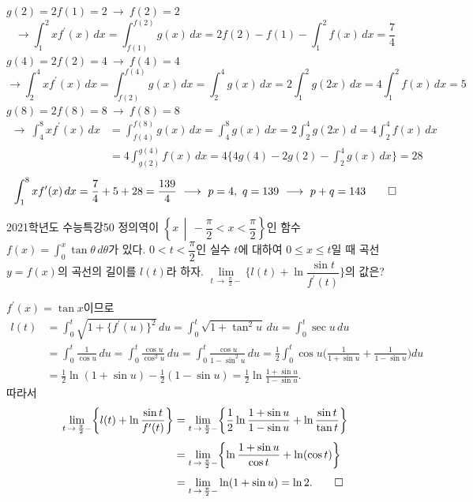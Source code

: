 \documentclass{article}
\begin{document}
\begin{sol}
	$g(2)=2f(1)=2~\longrightarrow~f(2)=2$
	\[
		\longrightarrow\int_1^2xf^{\prime}(x)\,dx=\int_{f(1)}^{f(2)}g(x)\,dx=2f(2)-f(1)-\int_1^2f(x)\,dx=\frac{7}{4}
	\]
	$g(4)=2f(2)=4~\longrightarrow~f(4)=4$
	\[
		\longrightarrow\int_2^4xf^{\prime}(x)\,dx=\int_{f(2)}^{f(4)}g(x)\,dx=\int_2^4g(x)\,dx=2\int_1^2g(2x)\,dx=4\int_1^2f(x)\,dx=5
	\]
	$g(8)=2f(8)=8~\longrightarrow~f(8)=8$
	\[
		\begin{aligned}
			\longrightarrow~\int_4^8xf^{\prime}(x)\,dx&=\int_{f(4)}^{f(8)}g(x)\,dx=\int_4^8g(x)\,dx=2\int_2^4g(2x)\,d=4\int_2^4f(x)\,dx\\[3pt]
			&=4\int_{g(2)}^{g(4)} f(x)\,dx=4\biggl\{4g(4)-2g(2)-\int_2^4g(x)\,dx\biggr\}=28
		\end{aligned}
	\]
	\[
		\int_1^8xf^{\prime}(x)\,dx=\frac{7}{4}+5+28=\frac{139}{4}~\longrightarrow~p=4,~q=139~\longrightarrow~p+q=143\qed
	\]
\end{sol}

\newpage
\begin{prob}{2021학년도 수능특강}{50}
	정의역이 $\left\{x\,\middle\vert\,-\dfrac{\pi}{2}<x<\dfrac{\pi}{2}\right\}$인 함수 $f(x)=\displaystyle\int_0^x\tan\theta\,d\theta$가 있다. $0<t<\dfrac{\pi}{2}$인 실수 $t$에 대하여 $0\leq x\leq t$일 때 곡선 $y=f(x)$의 곡선의 길이를 $l(t)$라 하자. $\lim\limits_{t\,\to\,\frac{\pi}{2}-}\biggl\{l(t)+\ln\dfrac{\sin t}{f^{\prime}(t)}\biggr\}$의 값은?
\end{prob}

\begin{sol}
	$f^\prime(x)=\tan x$이므로
	\[
		\begin{aligned}
			l(t)&=\int_0^t\sqrt{1+\{f^{\prime}(u)\}^2}\,du=\int_0^t\sqrt{1+\tan^2u}\,du=\int_0^t\sec u\,du\\[3pt]
			&=\int_0^t\frac{1}{\cos u}\,du=\int_0^t\frac{\cos u}{\cos^2u}\,du=\int_0^t\frac{\cos u}{1-\sin^2u}\,du=\frac{1}{2}\int_0^t\cos u\biggl(\frac{1}{1+\sin u}+\frac{1}{1-\sin u}\biggr)du\\[3pt]
			&=\frac{1}{2}\ln(1+\sin u)-\frac{1}{2}(1-\sin u)=\frac{1}{2}\ln\frac{1+\sin u}{1-\sin u}.
		\end{aligned}
	\]
	따라서
	\[
		\begin{aligned}
			\lim\limits_{t\,\to\,\frac{\pi}{2}-}\biggl\{l(t)+\ln\frac{\sin t}{f^{\prime}(t)}\biggr\}&=\lim\limits_{t\,\to\,\frac{\pi}{2}-}\biggl\{\frac{1}{2}\ln\frac{1+\sin u}{1-\sin u}+\ln\frac{\sin t}{\tan t}\biggr\}\\[3pt]
			&=\lim\limits_{t\,\to\,\frac{\pi}{2}-}\biggl\{\ln\frac{1+\sin u}{\cos t}+\ln(\cos t)\biggr\}\\[3pt]
			&=\lim\limits_{t\,\to\,\frac{\pi}{2}-}\ln(1+\sin u)=\ln 2.\qed
		\end{aligned}
	\]
\end{sol}
\end{document}
